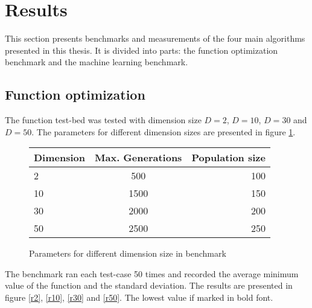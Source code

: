 \section{Results}

This section presents benchmarks and measurements of the four main algorithms presented in this thesis. It is divided into parts: the function optimization benchmark and the machine learning benchmark.

\subsection{Function optimization}

The function test-bed was tested with dimension size $D=2$, $D=10$, $D=30$ and $D=50$. The parameters for different dimension sizes are presented in figure \ref{t1}.

\begin{figure}[H]
  \centering
  \begin{center}
    \begin{tabular}{ | l | c | r | }
      \hline
      Dimension & Max. Generations & Population size \\ \hline
      2 & 500 & 100 \\ \hline
      10 & 1500 & 150 \\ \hline
      30 & 2000 & 200 \\ \hline
      50 & 2500 & 250 \\
      \hline
    \end{tabular}
  \end{center}
  \caption{Parameters for different dimension size in benchmark}
  \label{t1}
\end{figure}

The benchmark ran each test-case 50 times and recorded the average minimum value of the function and the standard deviation. The results are presented in figure \ref{r2}, \ref{r10}, \ref{r30} and \ref{r50}. The lowest value if marked in bold font.



